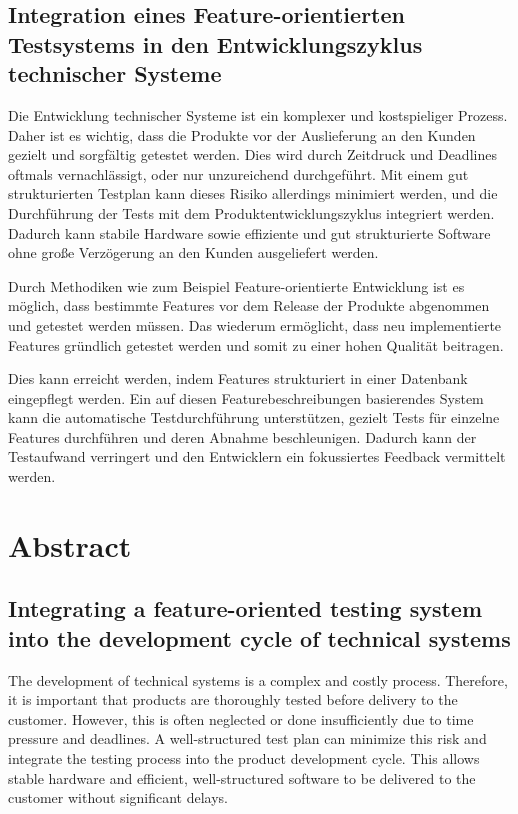 \documentclass[a4paper, fontsize=11pt, parskip=half, twoside]{scrreprt}
\begin{document}
	\subsection*{Integration eines Feature-orientierten Testsystems in den Entwicklungszyklus technischer Systeme}
	
	Die Entwicklung technischer Systeme ist ein komplexer und kostspieliger Prozess. 
	Daher ist es wichtig, dass die Produkte vor der Auslieferung an den Kunden gezielt und sorgfältig getestet werden. 
	Dies wird durch Zeitdruck und Deadlines oftmals vernachlässigt, oder nur unzureichend durchgeführt. 
	Mit einem gut strukturierten Testplan kann dieses Risiko allerdings minimiert werden, und die Durchführung der Tests mit dem Produktentwicklungszyklus integriert werden. 
	Dadurch kann stabile Hardware sowie effiziente und gut strukturierte Software ohne große Verzögerung an den Kunden ausgeliefert werden.
	
	Durch Methodiken wie zum Beispiel Feature-orientierte Entwicklung ist es möglich, dass bestimmte Features vor dem Release der Produkte abgenommen und getestet werden müssen. 
	Das wiederum ermöglicht, dass neu implementierte Features gründlich getestet werden und somit zu einer hohen Qualität beitragen.
	
	Dies kann erreicht werden, indem Features strukturiert in einer Datenbank eingepflegt werden. 
	Ein auf diesen Featurebeschreibungen basierendes System kann die automatische Testdurchführung unterstützen, gezielt Tests für einzelne Features durchführen und deren Abnahme beschleunigen. 
	Dadurch kann der Testaufwand verringert und den Entwicklern ein fokussiertes Feedback vermittelt werden.
	
	\newpage
	\section*{Abstract}
	\subsection*{Integrating a feature-oriented testing system into the development cycle of technical systems}
	
	The development of technical systems is a complex and costly process. 
	Therefore, it is important that products are thoroughly tested before delivery to the customer. 
	However, this is often neglected or done insufficiently due to time pressure and deadlines. 
	A well-structured test plan can minimize this risk and integrate the testing process into the product development cycle. 
	This allows stable hardware and efficient, well-structured software to be delivered to the customer without significant delays.
	
\end{document}
